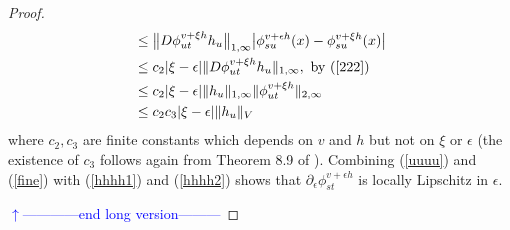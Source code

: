 \documentclass[noinfoline]{imsart}
\begin{document}
\begin{proof}
{\begin{align}
  &\leq   \bigl\| D\phi^{v+\xi h}_{ut} h_u \bigr\|_{1,\infty} \bigl| \phi^{v+\epsilon h}_{su}(x)-  \phi^{ v+\xi h}_{su}(x)  \bigr| \nonumber   \\
 &\leq  c_2 |\xi -\epsilon|  \| D\phi^{v+\xi h}_{ut} h_u \|_{1,\infty} ,\,\,\text{by (\ref{222})} \nonumber   \\
&\leq  c_2 |\xi -\epsilon|   \| h_u \|_{1,\infty} \| \phi^{v+\xi h}_{ut} \|_{2,\infty}  \nonumber   \\
&\leq  c_2 c_3|\xi -\epsilon|   \| h_u \|_{V}   \label{fine} 
\end{align}
where $c_2, c_3$  are finite constants which depends on $v$ and $h$ but not on   $\xi$ or $\epsilon$ (the existence of $c_3$ follows again from  Theorem 8.9 of \cite{you:10}). Combining (\ref{uuuu}) and (\ref{fine}) with (\ref{hhhh1}) and (\ref{hhhh2}) shows that $ \partial_\epsilon  \phi^{ v+\epsilon h}_{st}$  is locally Lipschitz in $\epsilon$.

   {\flushleft\textcolor{blue}{$\uparrow$------------end long version---------}}\newline
} \fi

 
 

\end{proof}
\end{document}
